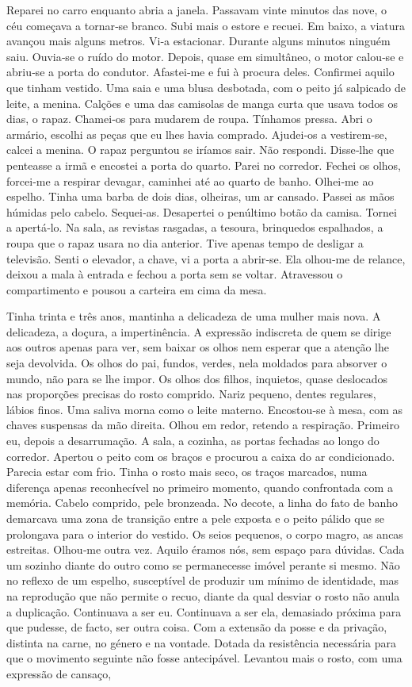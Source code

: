 Reparei no carro enquanto abria a janela. Passavam vinte minutos das
nove, o céu começava a tornar­‑se branco. Subi mais o estore e recuei.
Em baixo, a viatura avançou mais alguns metros. Vi­‑a estacionar.
Durante alguns minutos ninguém saiu. Ouvia­‑se o ruído do motor. Depois,
quase em simultâneo, o motor calou­‑se e abriu­‑se a porta do condutor.
Afastei­‑me e fui à procura deles. Confirmei aquilo que tinham vestido.
Uma saia e uma blusa desbotada, com o peito já salpicado de leite, a
menina. Calções e uma das camisolas de manga curta que usava todos os
dias, o rapaz. Chamei­‑os para mudarem de roupa. Tínhamos pressa. Abri o
armário, escolhi as peças que eu lhes havia comprado. Ajudei­‑os a
vestirem­‑se, calcei a menina. O rapaz perguntou se iríamos sair. Não
respondi. Disse­‑lhe que penteasse a irmã e encostei a porta do quarto.
Parei no corredor. Fechei os olhos, forcei­‑me a respirar devagar,
caminhei até ao quarto de banho. Olhei­‑me ao espelho. Tinha uma barba
de dois dias, olheiras, um ar cansado. Passei as mãos húmidas pelo
cabelo. Sequei­‑as. Desapertei o penúltimo botão da camisa. Tornei a
apertá­‑lo. Na sala, as revistas rasgadas, a tesoura, brinquedos
espalhados, a roupa que o rapaz usara no dia anterior. Tive apenas tempo
de desligar a televisão. Senti o elevador, a chave, vi a porta a
abrir­‑se. Ela olhou­‑me de relance, deixou a mala à entrada e fechou a
porta sem se voltar. Atravessou o compartimento e pousou a carteira em
cima da mesa.

Tinha trinta e três anos, mantinha a delicadeza de uma mulher mais nova.
A delicadeza, a doçura, a impertinência. A expressão indiscreta de quem
se dirige aos outros apenas para ver, sem baixar os olhos nem esperar
que a atenção lhe seja devolvida. Os olhos do pai, fundos, verdes, nela
moldados para absorver o mundo, não para se lhe impor. Os olhos dos
filhos, inquietos, quase deslocados nas proporções precisas do rosto
comprido. Nariz pequeno, dentes regulares, lábios finos. Uma saliva
morna como o leite materno. Encostou­‑se à mesa, com as chaves suspensas
da mão direita. Olhou em redor, retendo a respiração. Primeiro eu,
depois a desarrumação. A sala, a cozinha, as portas fechadas ao longo do
corredor. Apertou o peito com os braços e procurou a caixa do ar
condicionado. Parecia estar com frio. Tinha o rosto mais seco, os traços
marcados, numa diferença apenas reconhecível no primeiro momento, quando
confrontada com a memória. Cabelo comprido, pele bronzeada. No decote, a
linha do fato de banho demarcava uma zona de transição entre a pele
exposta e o peito pálido que se prolongava para o interior do vestido.
Os seios pequenos, o corpo magro, as ancas estreitas. Olhou­‑me outra
vez. Aquilo éramos nós, sem espaço para dúvidas. Cada um sozinho diante
do outro como se permanecesse imóvel perante si mesmo. Não no reflexo de
um espelho, susceptível de produzir um mínimo de identidade, mas na
reprodução que não permite o recuo, diante da qual desviar o rosto não
anula a duplicação. Continuava a ser eu. Continuava a ser ela, demasiado
próxima para que pudesse, de facto, ser outra coisa. Com a extensão da
posse e da privação, distinta na carne, no género e na vontade. Dotada
da resistência necessária para que o movimento seguinte não fosse
antecipável. Levantou mais o rosto, com uma expressão de cansaço,

